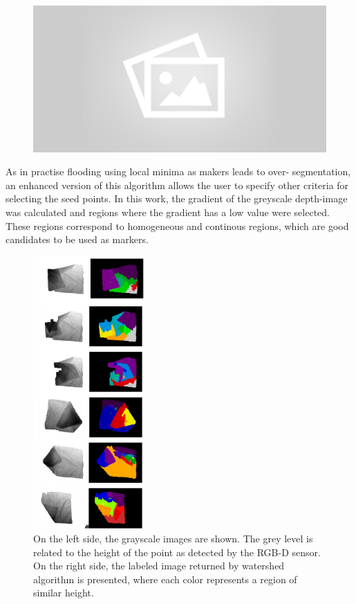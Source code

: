 \begin{figure}[thpb]
    \centering
    \includegraphics[width=0.7
    \textwidth]{figures/placeholder2.png}
    \caption{}
    \label{watershed_example}
\end{figure}


As in practise flooding using local minima as makers leads to over- segmentation, an enhanced version of this algorithm allows the user to specify other criteria for selecting the seed points. In this work, the gradient of the greyscale depth-image was calculated and regions where the gradient has a low value were selected. These regions correspond to homogeneous and continous regions, which are good candidates to be used as markers.

\begin{figure}[thpb]
    \centering
    \includegraphics[width=0.38\textwidth]{figures/colour_garment.pdf}
    \caption{On the left side, the grayscale images are shown. The grey level is related to the height of the point as detected by the RGB-D sensor. On the right side, the labeled image returned by watershed algorithm is presented, where each color represents a region of similar height.}
    \label{colour_garment}
\end{figure}
